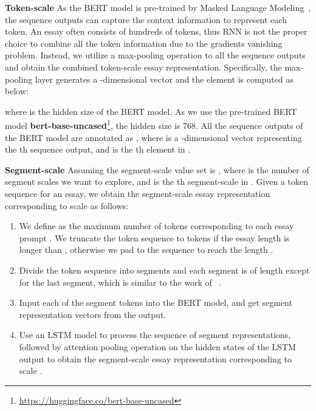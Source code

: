 \documentclass[11pt]{article}
\begin{document}
\textbf{Token-scale}
As the BERT model is pre-trained by Masked Language Modeling~\citep{Devlin:2019}, the sequence outputs can capture the context information to represent each token.
An essay often consists of hundreds of tokens, thus RNN is not the proper choice to combine all the token information due to the gradients vanishing problem.
Instead, we utilize a max-pooling operation to all the sequence outputs and obtain the combined token-scale essay representation.
Specifically, the max-pooling layer generates a -dimensional vector  and the element  is computed as below:
\begin{center}

\end{center}
where  is the hidden size of the BERT model.
As we use the pre-trained BERT model \textbf{bert-base-uncased}\footnote{\url{https://huggingface.co/bert-base-uncased}}, the hidden size  is 768.
All the  sequence outputs of the BERT model are annotated as , where  is a -dimensional vector  representing the th sequence output, and  is the th element in .

\textbf{Segment-scale} Assuming the segment-scale value set is , where  is the number of segment scales we want to explore, and  is the {th} segment-scale in .
Given a token sequence  for an essay, we obtain the segment-scale essay representation corresponding to scale  as follows:
\begin{enumerate}
\item 
We define  as the maximum number of tokens corresponding to each essay prompt .
We truncate the token sequence to  tokens if the essay length is longer than , otherwise we pad  to the sequence to reach the length .




\item Divide the token sequence into  segments and each segment is of length  except for the last segment, which is similar to the work of ~\citep{Mulyar:2019}.
 
\item Input each of the  segment tokens into the BERT model, and get  segment representation vectors from the  output.

\item Use an LSTM model to process the sequence of  segment representations, followed by attention pooling operation on the hidden states of the LSTM output to obtain the segment-scale essay representation corresponding to scale .
\end{enumerate}
  
\end{document}
